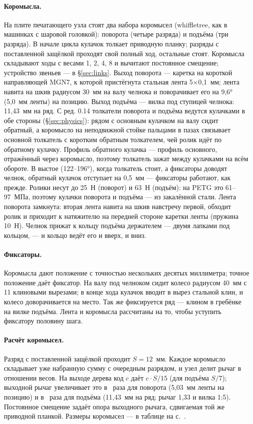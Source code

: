 \paragraph{Коромысла.} На плите печатающего узла стоят два набора коромысел (whiffletree, как в машинках с шаровой головкой): поворота (четыре разряда) и подъёма (три разряда). В начале цикла кулачок толкает приводную планку; разряды с поставленной защёлкой проходят свой полный ход, остальные стоят. Коромысла складывают ходы с весами 1, 2, 4, 8 и вычитают постоянное смещение; устройство звеньев — в \S\ref{sec:links}. Выход поворота — каретка на короткой направляющей MGN7, к которой пристёгнута стальная лента 5$\times$0,1~мм; лента навита на шкив радиусом 30~мм на валу челнока и поворачивает его на 9,6° (5,0~мм ленты) на позицию. Выход подъёма — вилка под ступицей челнока: 11,43~мм на ряд. С ред. 0.14 толкатели поворота и подъёма ведутся кулачками в обе стороны (\S\ref{sec:physics}): рядом с основным кулачком на валу сидит обратный, а коромысло на неподвижной стойке пальцами в пазах связывает основной толкатель с коротким обратным толкателем, чей ролик идёт по обратному кулачку. Профиль обратного кулачка — профиль основного, отражённый через коромысло, поэтому толкатель зажат между кулачками на всём обороте. В выстое (122--196°), когда толкатель стоит, а фиксаторы доводят челнок, обратный кулачок отступает на 0,5~мм — фиксаторы работают, как прежде. Ролики несут до 25~Н (поворот) и 63~Н (подъём): на PETG это 61--97~МПа, поэтому кулачки поворота и подъёма — из закалённой стали. Лента поворота замкнута: вторая лента навита на шкив навстречу первой, обходит ролик и приходит к натяжителю на передней стороне каретки ленты (пружина 10~Н). Челнок прижат к кольцу подъёма держателем — двумя лапками под кольцом, — и кольцо ведёт его и вверх, и вниз.

\paragraph{Фиксаторы.} Коромысла дают положение с точностью нескольких десятых миллиметра; точное положение даёт фиксатор. На валу под челноком сидит колесо радиусом 40~мм с 11 клиновыми вырезами; в конце хода кулачок вводит в вырез стальной клин, и колесо доворачивается на место. Так же фиксируется ряд — клином в гребёнке на вилке подъёма. Лента и коромысла рассчитаны на то, чтобы уступить фиксатору половину шага.

\paragraph{Расчёт коромысел.}
\label{sec:whiffle}
Разряд с поставленной защёлкой проходит $S = 12$~мм. Каждое коромысло складывает уже набранную сумму с очередным разрядом, и узел делит рычаг в отношении весов. На выходе дерева код $c$ даёт $c \cdot S/15$ (для подъёма $S/7$); выходной рычаг увеличивает это в \mgrot\ раза для поворота (5,03~мм ленты на позицию) и в \mglift\ раза для подъёма (11,43~мм на ряд; рычаг 1,33 и вилка 1:5). Постоянное смещение задаёт опора выходного рычага, сдвигаемая той же приводной планкой. Размеры коромысел — в таблице на с.~\pageref{tab:ladder}.

